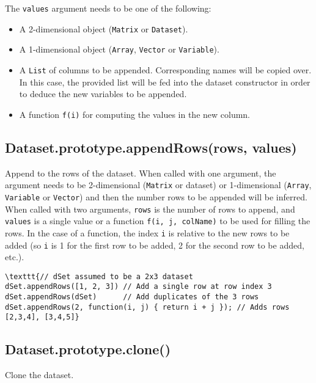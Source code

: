 \documentclass{article}
\begin{document}
The \texttt{values} argument needs to be one of the following:


\begin{itemize}

\item A 2-dimensional object (\texttt{Matrix} or \texttt{Dataset}).

\item A 1-dimensional object (\texttt{Array}, \texttt{Vector} or \texttt{Variable}).

\item A \texttt{List} of columns to be appended. Corresponding names will be copied over.
In this case, the provided list will be fed into the dataset constructor in
order to deduce the new variables to be appended.

\item A function \texttt{f(i)} for computing the values in the new column.

\end{itemize}

    \subsection{Dataset.prototype.appendRows(rows, values)}
    Append to the rows of the dataset.
When called with one argument, the argument needs to be 2-dimensional
(\texttt{Matrix} or dataset) or 1-dimensional (\texttt{Array}, \texttt{Variable} or \texttt{Vector}) and then
the number rows to be appended will be inferred.
When called with two arguments, \texttt{rows} is the number of rows to append, and \texttt{values}
is a single value or a function \texttt{f(i, j, colName)} to be used for filling the rows.
In the case of a function, the index \texttt{i} is relative to the new rows to be added
(so \texttt{i} is 1 for the first row to be added, 2 for the second row to be added, etc.).


\begin{lstlisting}
\texttt{// dSet assumed to be a 2x3 dataset
dSet.appendRows([1, 2, 3]) // Add a single row at row index 3
dSet.appendRows(dSet)      // Add duplicates of the 3 rows
dSet.appendRows(2, function(i, j) { return i + j }); // Adds rows [2,3,4], [3,4,5]}\end{lstlisting}

    \subsection{Dataset.prototype.clone()}
    Clone the dataset.
\end{document}
